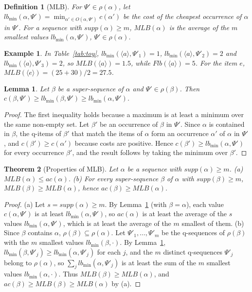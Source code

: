 \documentclass[pdflatex,sn-mathphys,Numbered]{sn-jnl}
\theoremstyle{thmstyleone}
\newtheorem{theorem}{Theorem}
\newtheorem{lemma}[theorem]{Lemma}
\theoremstyle{thmstyletwo}
\newtheorem{example}{Example}
\theoremstyle{thmstylethree}
\newtheorem{definition}{Definition}
\newcommand{\flb}{\ensuremath{\mathit{Flb}}}
\newcommand{\mlb}{\ensuremath{\mathit{MLB}}}
\newcommand{\supp}{\ensuremath{\mathit{supp}}}
\newcommand{\ac}{\ensuremath{\mathit{ac}}}
\newcommand{\lbmin}{\ensuremath{\mathit{lb}_{\min}}}
\newcommand{\seq}[1]{\langle #1\rangle}
\begin{document}
\begin{definition}[MLB]
For $\Psi' \in \rho(\alpha)$, let $\lbmin(\alpha,\Psi') = \min_{\alpha' \in O(\alpha,\Psi')}
c(\alpha')$ be the cost of the cheapest occurrence of $\alpha$ in $\Psi'$. For a sequence with
$\supp(\alpha) \ge m$, $\mlb(\alpha)$ is the average of the $m$ smallest values
$\lbmin(\alpha,\Psi')$, $\Psi' \in \rho(\alpha)$.
\end{definition}

\begin{example}
In Table~\ref{tab:toy}, $\lbmin(\seq{a},\Psi'_1) = 1$, $\lbmin(\seq{a},\Psi'_2) = 2$ and
$\lbmin(\seq{a},\Psi'_3) = 2$, so $\mlb(\seq{a}) = 1.5$, while $\flb(\seq{a}) = 5$.
For the item $e$, $\mlb(\seq{e}) = (25 + 30)/2 = 27.5$.
\end{example}

\begin{lemma}\label{lem:occ}
Let $\beta$ be a super-sequence of $\alpha$ and $\Psi' \in \rho(\beta)$. Then
$c(\beta,\Psi') \ge \lbmin(\beta,\Psi') \ge \lbmin(\alpha,\Psi')$.
\end{lemma}
\begin{proof}
The first inequality holds because a maximum is at least a minimum over the same non-empty set.
Let $\beta'$ be an occurrence of $\beta$ in $\Psi'$. Since $\alpha$ is contained in $\beta$,
the q-items of $\beta'$ that match the items of $\alpha$ form an occurrence $\alpha'$ of
$\alpha$ in $\Psi'$, and $c(\beta') \ge c(\alpha')$ because costs are positive. Hence
$c(\beta') \ge \lbmin(\alpha,\Psi')$ for every occurrence $\beta'$, and the result follows by
taking the minimum over $\beta'$.
\end{proof}

\begin{theorem}[Properties of MLB]\label{thm:mlb}
Let $\alpha$ be a sequence with $\supp(\alpha) \ge m$.
(a) $\mlb(\alpha) \le \ac(\alpha)$.
(b) For every super-sequence $\beta$ of $\alpha$ with $\supp(\beta) \ge m$,
$\mlb(\beta) \ge \mlb(\alpha)$, hence $\ac(\beta) \ge \mlb(\alpha)$.
\end{theorem}
\begin{proof}
(a) Let $s = \supp(\alpha) \ge m$. By Lemma~\ref{lem:occ} (with $\beta = \alpha$), each value
$c(\alpha,\Psi')$ is at least $\lbmin(\alpha,\Psi')$, so $\ac(\alpha)$ is at least the average
of the $s$ values $\lbmin(\alpha,\Psi')$, which is at least the average of the $m$ smallest
of them.
(b) Since $\beta$ contains $\alpha$, $\rho(\beta) \subseteq \rho(\alpha)$. Let
$\Psi'_{1}, \dots, \Psi'_{m}$ be the q-sequences of $\rho(\beta)$ with the $m$ smallest values
$\lbmin(\beta,\cdot)$. By Lemma~\ref{lem:occ}, $\lbmin(\beta,\Psi'_j) \ge
\lbmin(\alpha,\Psi'_j)$ for each $j$, and the $m$ distinct q-sequences $\Psi'_j$ belong to
$\rho(\alpha)$, so $\sum_j \lbmin(\alpha,\Psi'_j)$ is at least the sum of the $m$ smallest
values $\lbmin(\alpha,\cdot)$. Thus $\mlb(\beta) \ge \mlb(\alpha)$, and
$\ac(\beta) \ge \mlb(\beta) \ge \mlb(\alpha)$ by (a).
\end{proof}
\end{document}
